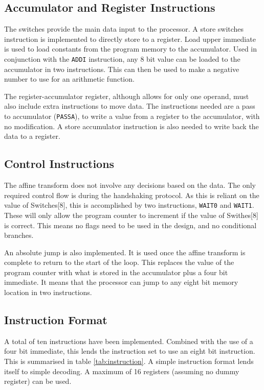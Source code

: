 \subsection{Accumulator and Register Instructions}

The switches provide the main data input to the processor. 
A store switches instruction is implemented to directly store to a register. 
Load upper immediate is used to load constants from the program memory to the accumulator. 
Used in conjunction with the \texttt{ADDI} instruction, any 8 bit value can be loaded to the accumulator in two instructions. 
This can then be used to make a negative number to use for an arithmetic function.

The register-accumulator register, although allows for only one operand, must also include extra instructions to move data.
The instructions needed are a pass to accumulator (\texttt{PASSA}), to write a value from a register to the accumulator, with no modification. 
A store accumulator instruction is also needed to write back the data to a register. 

\subsection{Control Instructions}

The affine transform does not involve any decisions based on the data. 
The only required control flow is during the handshaking protocol. 
As this is reliant on the value of Switches[8], this is accomplished by two instructions, \texttt{WAIT0} and \texttt{WAIT1}. 
These will only allow the program counter to increment if the value of Swithes[8] is correct.
This means no flags need to be used in the design, and no conditional branches. 

An absolute jump is also implemented. 
It is used once the affine transform is complete to return to the start of the loop.
This replaces the value of the program counter with what is stored in the accumulator plus a four bit immediate. 
It means that the processor can jump to any eight bit memory location in two instructions.


\subsection{Instruction Format}

A total of ten instructions have been implemented. 
Combined with the use of a four bit immediate, this lends the instruction set to use an eight bit instruction.
This is summarised in table \ref{tab:instruction}.
A simple instruction format lends itself to simple decoding. 
A maximum of 16 registers (assuming no dummy register) can be used.

